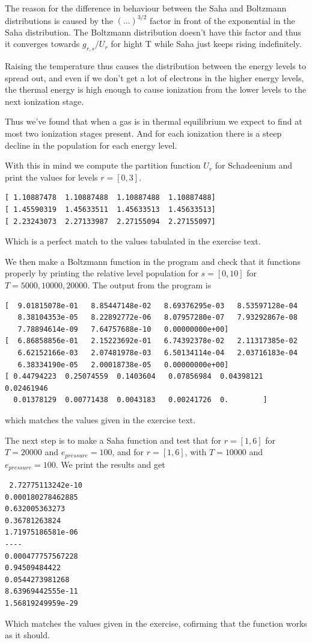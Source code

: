 \documentclass{aa}   %
\begin{document}
The reason for the difference in behaviour between the Saha and Boltzmann distributions is caused by the $(...)^{3/2}$ factor in front of the exponential in the Saha distribution. The Boltzmann distribution doesn't have this factor and thus it converges towards $g_{r,s}/U_r$ for hight T while Saha just keeps rising indefinitely.

Raising the temperature thus causes the distribution between the energy levels to spread out, and even if we don't get a lot of electrons in the higher energy levels, the thermal energy is high enough to cause ionization from the lower levels to the next ionization stage.

Thus we've found that when a gas is in thermal equilibrium we expect to find at most two ionization stages present. And for each ionization there is a steep decline in the population for each energy level.

With this in mind we compute the partition function $U_r$ for Schadeenium and print the values for levels $r =[0,3]$.
\begin{verbatim}
[ 1.10887478  1.10887488  1.10887488  1.10887488]
[ 1.45590319  1.45633511  1.45633513  1.45633513]
[ 2.23243073  2.27133987  2.27155094  2.27155097]
\end{verbatim}
Which is a perfect match to the values tabulated in the exercise text.

We then make a Boltzmann function in the program and check that it functions properly by printing the relative level population for $s = [0,10]$ for $T = 5000,10000,20000$. The output from the program is 
\begin{verbatim}
[  9.01815078e-01   8.85447148e-02   8.69376295e-03   8.53597128e-04
   8.38104353e-05   8.22892772e-06   8.07957280e-07   7.93292867e-08
   7.78894614e-09   7.64757688e-10   0.00000000e+00]
[  6.86858856e-01   2.15223692e-01   6.74392378e-02   2.11317385e-02
   6.62152166e-03   2.07481978e-03   6.50134114e-04   2.03716183e-04
   6.38334190e-05   2.00018738e-05   0.00000000e+00]
[ 0.44794223  0.25074559  0.1403604   0.07856984  0.04398121  0.02461946
  0.01378129  0.00771438  0.0043183   0.00241726  0.        ]
\end{verbatim}
which matches the values given in the exercise text.

The next step is to make a Saha function and test that for $r = [1,6]$ for $T = 20000$ and $e_{pressure} = 100$, and for $r = [1,6]$, with $T = 10000$ and $e_{pressure} = 100$. We print the results and get 
\begin{verbatim}
 2.72775113242e-10
0.000180278462885
0.632005363273
0.36781263824
1.71975186581e-06
----
0.000477757567228
0.94509484422
0.0544273981268
8.63969442555e-11
1.56819249959e-29
\end{verbatim}
Which matches the values given in the exercise, cofirming that the function works as it should.
\end{document}
